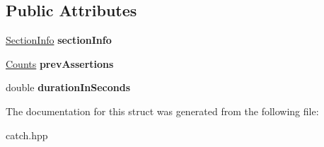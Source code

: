 \subsection*{Public Attributes}
\begin{DoxyCompactItemize}
\item 
\hyperlink{structCatch_1_1SectionInfo}{Section\+Info} {\bfseries section\+Info}\hypertarget{structCatch_1_1SectionEndInfo_a2d44793392cb83735d086d726822abe9}{}\label{structCatch_1_1SectionEndInfo_a2d44793392cb83735d086d726822abe9}

\item 
\hyperlink{structCatch_1_1Counts}{Counts} {\bfseries prev\+Assertions}\hypertarget{structCatch_1_1SectionEndInfo_ae70b154cbc05b5dd2901d97f89303d8c}{}\label{structCatch_1_1SectionEndInfo_ae70b154cbc05b5dd2901d97f89303d8c}

\item 
double {\bfseries duration\+In\+Seconds}\hypertarget{structCatch_1_1SectionEndInfo_a7c262f2dab9cff166b8eca620c47eea5}{}\label{structCatch_1_1SectionEndInfo_a7c262f2dab9cff166b8eca620c47eea5}

\end{DoxyCompactItemize}


The documentation for this struct was generated from the following file\+:\begin{DoxyCompactItemize}
\item 
catch.\+hpp\end{DoxyCompactItemize}
